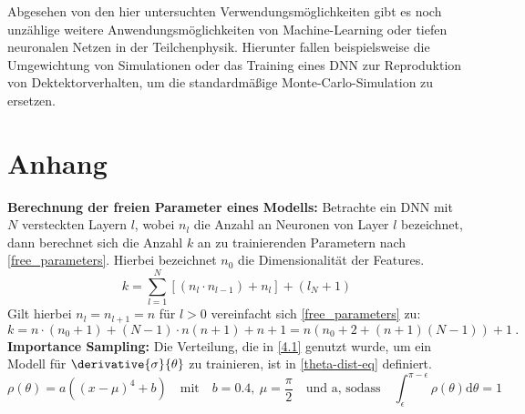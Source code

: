 Abgesehen von den hier untersuchten Verwendungsmöglichkeiten gibt es noch unzählige weitere Anwendungsmöglichkeiten von Machine-Learning oder tiefen neuronalen Netzen in der Teilchenphysik. Hierunter fallen beispielsweise die Umgewichtung von Simulationen oder das Training eines DNN zur Reproduktion von Dektektorverhalten, um die standardmäßige Monte-Carlo-Simulation zu ersetzen.
\appendix
\chapter{Anhang}
\textbf{Berechnung der freien Parameter eines Modells:} \label{freie parameter} Betrachte ein DNN mit $N$ versteckten Layern $l$, wobei $n_l$ die Anzahl an Neuronen von Layer $l$ bezeichnet, dann berechnet sich die Anzahl $k$ an zu trainierenden Parametern nach \textsf{\autoref{free_parameters}}. Hierbei bezeichnet $n_0$ die Dimensionalität der Features.
\begin{equation}
	k = \sum_{l=1}^{N} \left[(n_l \cdot n_{l-1}) + n_l\right] + (l_N + 1)
	\label{free_parameters}
\end{equation}
Gilt hierbei $n_l = n_{l+1} = n$ für $l > 0$ vereinfacht sich \textsf{\autoref{free_parameters}} zu:
\begin{equation}
	k = n \cdot (n_0 + 1) + (N-1)\cdot n(n+1) + n + 1 = n \left(n_0 + 2 + (n + 1)(N-1)\right) + 1~.
\end{equation}
\textbf{Importance Sampling:} Die Verteilung, die in \textsf{\autoref{4.1}} genutzt wurde, um ein Modell für $\derivative{\sigma}{\theta}$ zu trainieren, ist in \textsf{\autoref{theta-dist-eq}} definiert.
\begin{equation}
	\label{theta-dist-eq}
	\rho(\theta) = a((x-\mu)^4 + b) \quad \text{mit} \quad b=0.4,~ \mu = \frac{\pi}{2} \quad \text{und a, sodass} \quad \int_{\epsilon}^{\pi - \epsilon} \rho(\theta) \text{d}\theta = 1
\end{equation}

